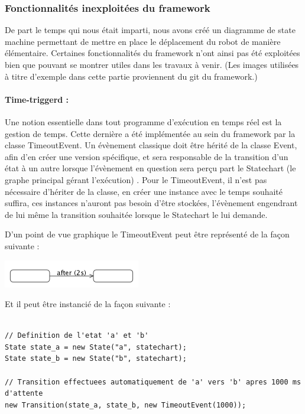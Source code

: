 \documentclass[french, 12pt, a4paper]{article}
\begin{document}
        \subsubsection{Fonctionnalités inexploitées du framework}
        De part le temps qui nous était imparti, nous avons créé un diagramme de state machine permettant de mettre en place le déplacement du robot de manière élémentaire. Certaines fonctionnalités du framework n'ont ainsi pas été exploitées bien que pouvant se montrer utiles dans les travaux à venir. (Les images utilisées à titre d'exemple dans cette partie proviennent du git du framework.)
        
        \paragraph{Time-triggerd : }
        Une notion essentielle dans tout programme d'exécution en temps réel est la gestion de temps. Cette dernière a été implémentée au sein du framework par la classe TimeoutEvent. Un évènement classique doit être hérité de la classe Event, afin d'en créer une version spécifique, et sera responsable de la transition d'un état à un autre lorsque l'évènement en question sera perçu part le Statechart (le graphe principal gérant l'exécution) . Pour le TimeoutEvent, il n'est pas nécessaire d'hériter de la classe, en créer une instance avec le temps souhaité suffira, ces instances n'auront pas besoin d'être stockées, l'évènement engendrant de lui même la transition souhaitée lorsque le Statechart le lui demande.
        \bigskip
        
        D'un point de vue graphique le TimeoutEvent peut être représenté de la façon suivante :
        
        \begin{center}
			\captionsetup{type=figure}
			\includegraphics[scale=1]{Images/time_triggered_transition.png}
	    \end{center}
	    
	   Et il peut être instancié de la façon suivante :
        
         \begin{lstlisting}[basicstyle=\small]

// Definition de l'etat 'a' et 'b'
State state_a = new State("a", statechart);
State state_b = new State("b", statechart);

// Transition effectuees automatiquement de 'a' vers 'b' apres 1000 ms d'attente 
new Transition(state_a, state_b, new TimeoutEvent(1000));
        \end{lstlisting}
        
\end{document}
